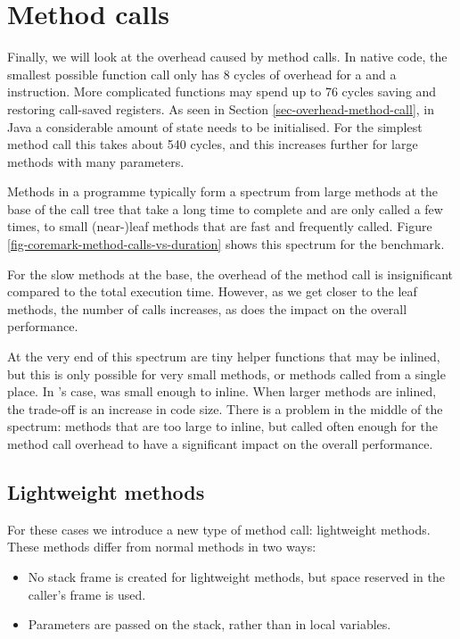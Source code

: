 \section{Method calls}
\label{sec-optimisations-method-calls}

Finally, we will look at the overhead caused by method calls. In native code, the smallest possible function call only has 8 cycles of overhead for a  and a  instruction. More complicated functions may spend up to 76 cycles saving and restoring call-saved registers. As seen in Section \ref{sec-overhead-method-call}, in Java a considerable amount of state needs to be initialised. For the simplest method call this takes about 540 cycles, and this increases further for large methods with many parameters.

Methods in a programme typically form a spectrum from large methods at the base of the call tree that take a long time to complete and are only called a few times, to small (near-)leaf methods that are fast and frequently called. Figure \ref{fig-coremark-method-calls-vs-duration} shows this spectrum for the  benchmark.

For the slow methods at the base, the overhead of the method call is insignificant compared to the total execution time. However, as we get closer to the leaf methods, the number of calls increases, as does the impact on the overall performance.

At the very end of this spectrum are tiny helper functions that may be inlined, but this is only possible for very small methods, or methods called from a single place. In 's case,  was small enough to inline. When larger methods are inlined, the trade-off is an increase in code size. There is a problem in the middle of the spectrum: methods that are too large to inline, but called often enough for the method call overhead to have a significant impact on the overall performance.

\subsection{Lightweight methods}
For these cases we introduce a new type of method call: lightweight methods. These methods differ from normal methods in two ways:
\begin{itemize}
	\item No stack frame is created for lightweight methods, but space reserved in the caller's frame is used.
	\item Parameters are passed on the stack, rather than in local variables.
\end{itemize}

